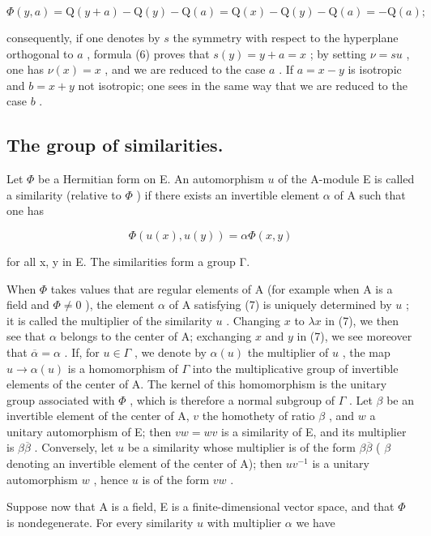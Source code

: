 \[
\Phi (y, a) = \mathrm{Q} (y + a) - \mathrm{Q} (y) - \mathrm{Q} (a) = \mathrm{Q} (x) - \mathrm{Q} (y) - \mathrm{Q} (a) = - \mathrm{Q} (a);
\]

consequently, if one denotes by \(s\) the symmetry with respect to the hyperplane orthogonal to \(a\) , formula (6) proves that \(s(y) = y + a = x\) ; by setting \(\nu = su\) , one has \(\nu(x) = x\) , and we are reduced to the case \(a\) . If \(a = x - y\) is isotropic and \(b = x + y\) not isotropic; one sees in the same way that we are reduced to the case \(b\) .

\subsection{The group of similarities.}

Let \(\Phi\) be a Hermitian form on E. An automorphism \(u\) of the A-module E is called a similarity (relative to \(\Phi\) ) if there exists an invertible element \(\alpha\) of A such that one has

\[
\Phi (u (x), u (y)) = \alpha \Phi (x, y)\tag{7}
\]

for all x, y in E. The similarities form a group Γ.

When \(\Phi\) takes values that are regular elements of A (for example when A is a field and \(\Phi \neq 0\) ), the element \(\alpha\) of A satisfying (7) is uniquely determined by \(u\) ; it is called the multiplier of the similarity \(u\) . Changing \(x\) to \(\lambda x\) in (7), we then see that \(\alpha\) belongs to the center of A; exchanging \(x\) and \(y\) in (7), we see moreover that \(\overline{\alpha} = \alpha\) . If, for \(u \in \Gamma\) , we denote by \(\alpha(u)\) the multiplier of \(u\) , the map \(u \to \alpha(u)\) is a homomorphism of \(\Gamma\) into the multiplicative group of invertible elements of the center of A. The kernel of this homomorphism is the unitary group associated with \(\Phi\) , which is therefore a normal subgroup of \(\Gamma\) . Let \(\beta\) be an invertible element of the center of A, \(v\) the homothety of ratio \(\beta\) , and \(w\) a unitary automorphism of E; then \(vw = wv\) is a similarity of E, and its multiplier is \(\beta\overline{\beta}\) . Conversely, let \(u\) be a similarity whose multiplier is of the form \(\beta\overline{\beta}\) ( \(\beta\) denoting an invertible element of the center of A); then \(uv^{-1}\) is a unitary automorphism \(w\) , hence \(u\) is of the form \(vw\) .

Suppose now that A is a field, E is a finite-dimensional vector space, and that \(\Phi\) is nondegenerate. For every similarity \(u\) with multiplier \(\alpha\) we have

